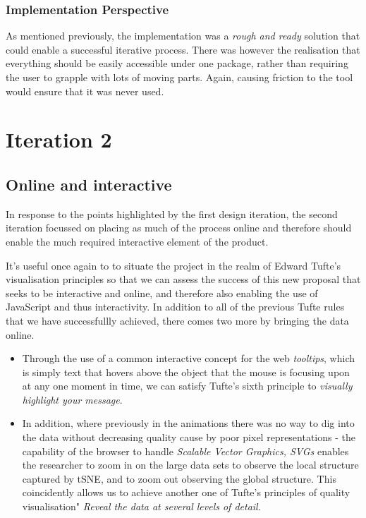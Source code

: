 \documentclass[a4paper,11pt,titlepage]{article}
\begin{document}
		\subsubsection{Implementation Perspective}	
		As mentioned previously, the implementation was a \textit{rough and ready} solution that could enable a successful iterative process. There was however the realisation that everything should be easily accessible under one package, rather than requiring the user to grapple with lots of moving parts. Again, causing friction to the tool would ensure that it was never used.
		
\clearpage 

\section{Iteration 2}
	\subsection{Online and interactive}
	In response to the points highlighted by the first design iteration, the second iteration focussed on placing as much of the process online and therefore should enable the much required interactive element of the product. 
	\par 
	It's useful once again to to situate the project in the realm of Edward Tufte's visualisation principles so that we can assess the success of this new proposal that seeks to be interactive and online, and therefore also enabling the use of JavaScript and thus interactivity. In addition to all of the previous Tufte rules that we have successfullly achieved, there comes two more by bringing the data online. 
	\begin{itemize}
		\item Through the use of a common interactive concept for the web \textit{tooltips}, which is simply text that hovers above the object that the mouse is focusing upon at any one moment in time, we can satisfy Tufte's sixth principle to \textit{visually highlight your message}. 
		\item In addition, where previously in the animations there was no way to dig into the data without decreasing quality cause by poor pixel representations - the capability of the browser to handle \textit{Scalable Vector Graphics, SVGs} enables the researcher to zoom in on the large data sets to observe the local structure captured by tSNE, and to zoom out observing the global structure. This coincidently allows us to achieve another one of Tufte's principles of quality visualisation" \textit{Reveal the data at several levels of detail}. 
	\end{itemize}
	
\end{document}
